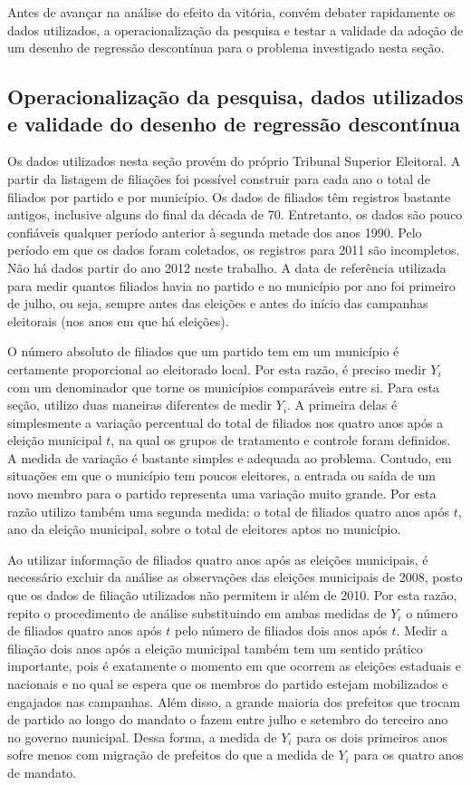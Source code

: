Antes de avançar na análise do efeito da vitória, convém debater rapidamente os dados utilizados, a operacionalização da pesquisa e testar a validade da adoção de um desenho de regressão descontínua para o problema investigado nesta seção.

\subsection{Operacionalização da pesquisa, dados utilizados e validade do desenho de regressão descontínua}

Os dados utilizados nesta seção provém do próprio Tribunal Superior Eleitoral. A partir da listagem de filiações foi possível construir para cada ano o total de filiados por partido e por município. Os dados de filiados têm registros bastante antigos, inclusive alguns do final da década de 70. Entretanto, os dados são pouco confiáveis qualquer período anterior à segunda metade dos anos 1990. Pelo período em que os dados foram coletados, os registros para 2011 são incompletos. Não há dados partir do ano 2012 neste trabalho. A data de referência utilizada para medir quantos filiados havia no partido e no município por ano foi primeiro de julho, ou seja, sempre antes das eleições e antes do início das campanhas eleitorais (nos anos em que há eleições).

O número absoluto de filiados que um partido tem em um município é certamente proporcional ao eleitorado local. Por esta razão, é preciso medir $Y_{i}$ com um denominador que torne os municípios comparáveis entre si. Para esta seção, utilizo duas maneiras diferentes de medir $Y_{i}$. A primeira delas é simplesmente a variação percentual do total de filiados nos quatro anos após a eleição municipal $t$, na qual os grupos de tratamento e controle foram definidos. A medida de variação é bastante simples e adequada ao problema. Contudo, em situações em que o município tem poucos eleitores, a entrada ou saída de um novo membro para o partido representa uma variação muito grande. Por esta razão utilizo também uma segunda medida: o total de filiados quatro anos após $t$, ano da eleição municipal, sobre o total de eleitores aptos no município.

Ao utilizar informação de filiados quatro anos após as eleições municipais, é necessário excluir da análise as observações das eleições municipais de 2008, posto que os dados de filiação utilizados não permitem ir além de 2010. Por esta razão, repito o procedimento de análise substituindo em ambas medidas de $Y_{i}$ o número de filiados quatro anos após $t$ pelo número de filiados dois anos após $t$. Medir a filiação dois anos após a eleição municipal também tem um sentido prático importante, pois é exatamente o momento em que ocorrem as eleições estaduais e nacionais e no qual se espera que os membros do partido estejam mobilizados e engajados nas campanhas. Além disso, a grande maioria dos prefeitos que trocam de partido ao longo do mandato o fazem entre julho e setembro do terceiro ano no governo municipal. Dessa forma, a medida de $Y_{i}$ para os dois primeiros anos sofre menos com migração de prefeitos do que a medida de $Y_{i}$ para os quatro anos de mandato.

